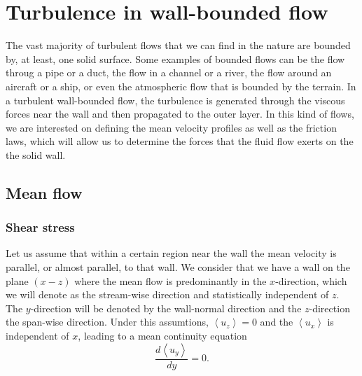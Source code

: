 \section{Turbulence in wall-bounded flow}
The vast majority of turbulent flows that we can find in the nature are bounded by, at least, one solid surface. Some examples of bounded flows can be the flow throug a pipe or a duct, the flow in a channel or a river, the flow around an aircraft or a ship, or even the atmospheric flow that is bounded by the terrain. In a turbulent wall-bounded flow, the turbulence is generated through the viscous forces near the wall and then propagated to the outer layer. In this kind of flows, we are interested on defining the mean velocity profiles as well as the friction laws, which will allow us to determine the forces that the fluid flow exerts on the the solid wall.
\subsection{Mean flow}
\subsubsection{Shear stress}
Let us assume that within a certain region near the wall the mean velocity is parallel, or almost parallel, to that wall. We consider that we have a wall on the plane $ (x-z) $ where the mean flow is predominantly in the $ x $-direction, which we will denote as the stream-wise direction and statistically independent of $ z $. The $ y $-direction will be denoted by the wall-normal direction and the $ z $-direction the span-wise direction. Under this assumtions, $ \left\langle u_z\right\rangle=0 $ and the $ \left\langle u_x\right\rangle $ is independent of $ x $, leading to a mean continuity equation
\begin{equation}
\label{eq-mean_continuity}
\frac{d\left\langle u_y\right\rangle}{dy}=0.
\end{equation}

